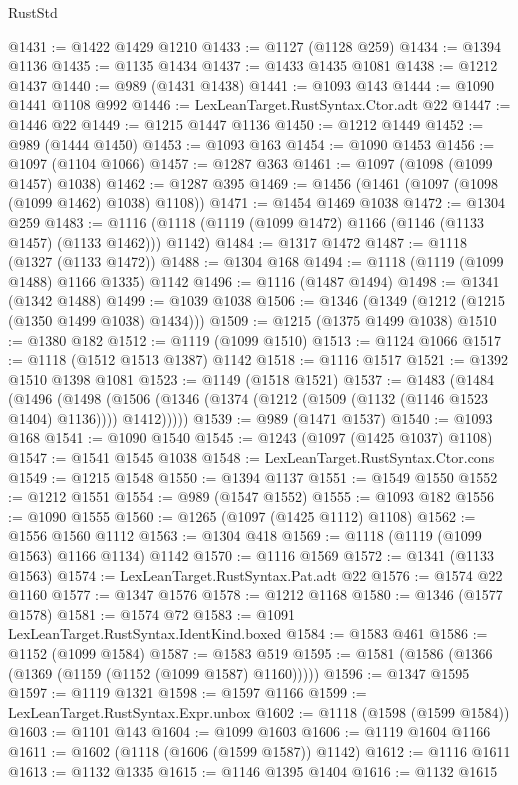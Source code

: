 \begin{lexlean}{RustStd}
\begin{coremodule}
@1431 := @1422 @1429 @1210
@1433 := @1127 (@1128 @259)
@1434 := @1394 @1136
@1435 := @1135 @1434
@1437 := @1433 @1435 @1081
@1438 := @1212 @1437
@1440 := @989 (@1431 @1438)
@1441 := @1093 @143
@1444 := @1090 @1441 @1108 @992
@1446 := LexLeanTarget.RustSyntax.Ctor.adt @22
@1447 := @1446 @22
@1449 := @1215 @1447 @1136
@1450 := @1212 @1449
@1452 := @989 (@1444 @1450)
@1453 := @1093 @163
@1454 := @1090 @1453
@1456 := @1097 (@1104 @1066)
@1457 := @1287 @363
@1461 := @1097 (@1098 (@1099 @1457) @1038)
@1462 := @1287 @395
@1469 := @1456 (@1461 (@1097 (@1098 (@1099 @1462) @1038) @1108))
@1471 := @1454 @1469 @1038
@1472 := @1304 @259
@1483 := @1116 (@1118 (@1119 (@1099 @1472) @1166 (@1146 (@1133 @1457) (@1133 @1462))) @1142)
@1484 := @1317 @1472
@1487 := @1118 (@1327 (@1133 @1472))
@1488 := @1304 @168
@1494 := @1118 (@1119 (@1099 @1488) @1166 @1335) @1142
@1496 := @1116 (@1487 @1494)
@1498 := @1341 (@1342 @1488)
@1499 := @1039 @1038
@1506 := @1346 (@1349 (@1212 (@1215 (@1350 @1499 @1038) @1434)))
@1509 := @1215 (@1375 @1499 @1038)
@1510 := @1380 @182
@1512 := @1119 (@1099 @1510)
@1513 := @1124 @1066
@1517 := @1118 (@1512 @1513 @1387) @1142
@1518 := @1116 @1517
@1521 := @1392 @1510 @1398 @1081
@1523 := @1149 (@1518 @1521)
@1537 := @1483
    (@1484
      (@1496
        (@1498 (@1506 (@1346 (@1374 (@1212 (@1509 (@1132 (@1146 @1523 @1404) @1136)))) @1412)))))
@1539 := @989 (@1471 @1537)
@1540 := @1093 @168
@1541 := @1090 @1540
@1545 := @1243 (@1097 (@1425 @1037) @1108)
@1547 := @1541 @1545 @1038
@1548 := LexLeanTarget.RustSyntax.Ctor.cons
@1549 := @1215 @1548
@1550 := @1394 @1137
@1551 := @1549 @1550
@1552 := @1212 @1551
@1554 := @989 (@1547 @1552)
@1555 := @1093 @182
@1556 := @1090 @1555
@1560 := @1265 (@1097 (@1425 @1112) @1108)
@1562 := @1556 @1560 @1112
@1563 := @1304 @418
@1569 := @1118 (@1119 (@1099 @1563) @1166 @1134) @1142
@1570 := @1116 @1569
@1572 := @1341 (@1133 @1563)
@1574 := LexLeanTarget.RustSyntax.Pat.adt @22
@1576 := @1574 @22 @1160
@1577 := @1347 @1576
@1578 := @1212 @1168
@1580 := @1346 (@1577 @1578)
@1581 := @1574 @72
@1583 := @1091 LexLeanTarget.RustSyntax.IdentKind.boxed
@1584 := @1583 @461
@1586 := @1152 (@1099 @1584)
@1587 := @1583 @519
@1595 := @1581 (@1586 (@1366 (@1369 (@1159 (@1152 (@1099 @1587) @1160)))))
@1596 := @1347 @1595
@1597 := @1119 @1321
@1598 := @1597 @1166
@1599 := LexLeanTarget.RustSyntax.Expr.unbox
@1602 := @1118 (@1598 (@1599 @1584))
@1603 := @1101 @143
@1604 := @1099 @1603
@1606 := @1119 @1604 @1166
@1611 := @1602 (@1118 (@1606 (@1599 @1587)) @1142)
@1612 := @1116 @1611
@1613 := @1132 @1335
@1615 := @1146 @1395 @1404
@1616 := @1132 @1615

\end{coremodule}
\end{lexlean}
